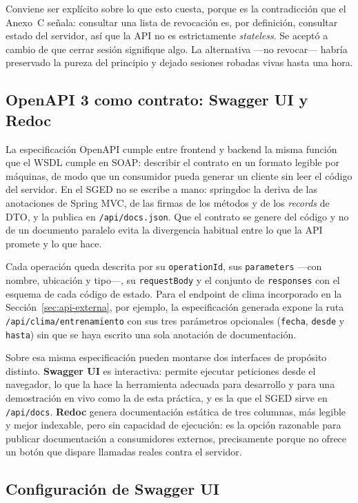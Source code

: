 \documentclass[12pt,a4paper]{article}
\begin{document}
Conviene ser explícito sobre lo que esto cuesta, porque es la contradicción que el Anexo~C
señala: consultar una lista de revocación es, por definición, consultar estado del servidor, así
que la API no es estrictamente \textit{stateless}. Se aceptó a cambio de que cerrar sesión
signifique algo. La alternativa ---no revocar--- habría preservado la pureza del principio y
dejado sesiones robadas vivas hasta una hora.

\subsection{OpenAPI 3 como contrato: Swagger UI y Redoc}

La especificación OpenAPI cumple entre frontend y backend la misma función que el WSDL cumple en
SOAP: describir el contrato en un formato legible por máquinas, de modo que un consumidor pueda
generar un cliente sin leer el código del servidor. En el SGED no se escribe a mano: springdoc la
deriva de las anotaciones de Spring MVC, de las firmas de los métodos y de los \textit{records}
de DTO, y la publica en \texttt{/api/docs.json}. Que el contrato se genere del código y no de un
documento paralelo evita la divergencia habitual entre lo que la API promete y lo que hace.

Cada operación queda descrita por su \texttt{operationId}, sus \texttt{parameters} ---con
nombre, ubicación y tipo---, su \texttt{requestBody} y el conjunto de \texttt{responses} con el
esquema de cada código de estado. Para el endpoint de clima incorporado en la
Sección~\ref{sec:api-externa}, por ejemplo, la especificación generada expone la ruta
\texttt{/api/clima/entrenamiento} con sus tres parámetros opcionales (\texttt{fecha},
\texttt{desde} y \texttt{hasta}) sin que se haya escrito una sola anotación de documentación.

Sobre esa misma especificación pueden montarse dos interfaces de propósito distinto.
\textbf{Swagger UI} es interactiva: permite ejecutar peticiones desde el navegador, lo que la
hace la herramienta adecuada para desarrollo y para una demostración en vivo como la de esta
práctica, y es la que el SGED sirve en \texttt{/api/docs}. \textbf{Redoc} genera documentación
estática de tres columnas, más legible y mejor indexable, pero sin capacidad de ejecución: es la
opción razonable para publicar documentación a consumidores externos, precisamente porque no
ofrece un botón que dispare llamadas reales contra el servidor.

\subsection{Configuración de Swagger UI}
\end{document}
